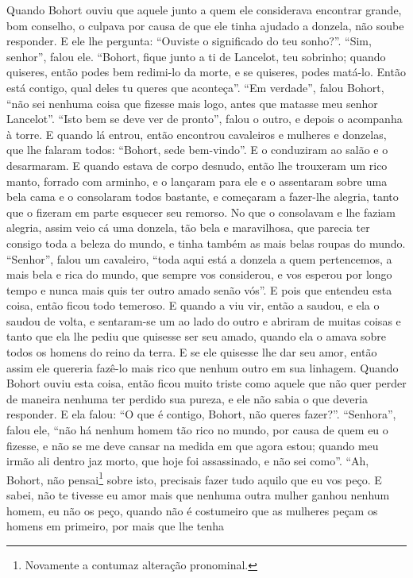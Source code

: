 Quando Bohort ouviu que aquele junto a quem ele considerava encontrar grande,
bom conselho, o culpava por causa de que ele tinha ajudado a donzela, não soube
responder. E ele lhe pergunta: “Ouviste o significado do teu sonho?”. “Sim,
senhor”, falou ele. “Bohort, fique junto a ti de Lancelot, teu sobrinho;
quando quiseres, então podes bem redimi-lo da morte, e se quiseres, podes
matá-lo. Então está contigo, qual deles tu queres que aconteça”. “Em
verdade”, falou Bohort, “não sei nenhuma coisa que fizesse mais logo, antes que
matasse meu senhor Lancelot”. “Isto bem se deve ver de pronto”, falou o outro,
e depois o acompanha à torre. E quando lá entrou, então encontrou cavaleiros e
mulheres e donzelas, que lhe falaram todos: “Bohort, sede bem-vindo”. E o
conduziram ao salão e o desarmaram. E quando estava de corpo desnudo, então lhe
trouxeram um rico manto, forrado com arminho, e o lançaram para ele e o
assentaram sobre uma bela cama e o consolaram todos bastante, e começaram a
fazer-lhe alegria, tanto que o fizeram em parte esquecer seu remorso. No que o
consolavam e lhe faziam alegria, assim veio cá uma donzela, tão bela e
maravilhosa, que parecia ter consigo toda a beleza do mundo, e tinha também as
mais belas roupas do mundo. “Senhor”, falou um cavaleiro, “toda aqui está a
donzela a quem pertencemos, a mais bela e rica do mundo, que sempre vos
considerou, e vos esperou por longo tempo e nunca mais quis ter outro amado
senão vós”. E pois que entendeu esta coisa, então ficou todo temeroso. E quando
a viu vir, então a saudou, e ela o saudou de volta, e sentaram-se um ao lado do
outro e abriram de muitas coisas e tanto que ela lhe pediu que quisesse ser seu
amado, quando ela o amava sobre todos os homens do reino da terra. E se ele
quisesse lhe dar seu amor, então assim ele quereria fazê-lo mais rico que
nenhum outro em sua linhagem. Quando Bohort ouviu esta coisa, então
ficou muito triste como aquele que não quer perder de maneira nenhuma ter
perdido sua pureza, e ele não sabia o que deveria responder. E ela falou: “O
que é contigo, Bohort, não queres fazer?”. “Senhora”, falou ele, “não há nenhum
homem tão rico no mundo, por causa de quem eu o fizesse, e não se me deve
cansar na medida em que agora estou; quando meu irmão ali dentro jaz morto, que
hoje foi assassinado, e não sei como”. “Ah, Bohort, não pensai\footnote{
Novamente a contumaz alteração pronominal. } sobre isto, precisais
fazer tudo aquilo que eu vos peço. E sabei, não te tivesse eu amor mais que
nenhuma outra mulher ganhou nenhum homem, eu não os peço, quando não é
costumeiro que as mulheres peçam os homens em primeiro, por mais que lhe tenha

